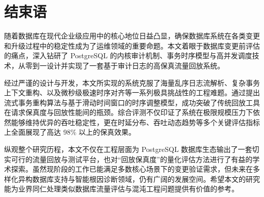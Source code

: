 \newpage
{}
\section*{结束语}

随着数据库在现代企业级应用中的核心地位日益凸显，确保数据库系统在各类变更和升级过程中的稳定性成为了运维领域的重要命题。本文着眼于数据库变更前评估的痛点，深入钻研了 PostgreSQL 的内核审计机制、事务时序模型与高并发调度技术，从零到一设计并实现了一套基于审计日志的高保真流量回放系统。

经过严谨的设计与开发，本文所实现的系统克服了海量乱序日志流解析、复杂事务上下文重构、以及微秒级极速时序对齐等一系列极具挑战性的工程难题。通过提出流式事务重构算法与基于滑动时间窗口的时序调整模型，成功突破了传统回放工具在请求保真度与回放性能间的瓶颈。综合评测不仅印证了系统在极限规模压力下依然能够维持优异的吞吐稳定性，更在时延分布、吞吐动态趋势等多个关键评估指标上全面展现了高达 98\% 以上的保真效果。

纵观整个研究历程，本文不仅在工程层面为 PostgreSQL 数据库生态输出了一套切实可行的流量回放与测试平台，也对“回放保真度”的量化评估方法进行了有益的学术探索。虽然现阶段的工作已能满足多数核心场景下的变更验证需求，但未来在多样化异构数据库支持与智能根因诊断领域，仍有广阔的发展空间。希望本文的研究能为业界同仁处理类似数据库流量评估与混沌工程问题提供有价值的参考。